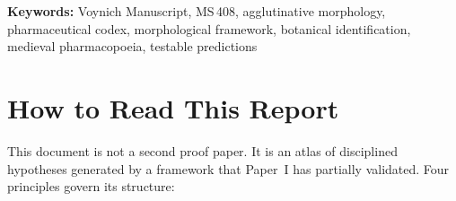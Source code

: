 \documentclass[11pt,a4paper]{article}
\begin{document}
\textbf{Keywords:} Voynich Manuscript, MS\,408, agglutinative morphology, pharmaceutical codex, morphological framework, botanical identification, medieval pharmacopoeia, testable predictions

\newpage
\tableofcontents
\newpage

\section*{How to Read This Report}

This document is not a second proof paper. It is an atlas of disciplined hypotheses generated by a framework that Paper~I has partially validated. Four principles govern its structure:
\end{document}
